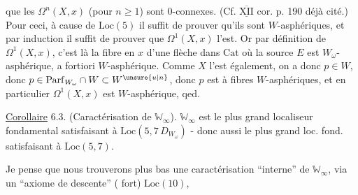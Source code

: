 que les $\Omega^n(X,x)$ (pour $n\geq1$) sont $0$-connexes. (Cf. $\overline{\underline{\mathrm{XII}}}$ cor. p. 190 déjà cité.) Pour ceci, à cause de $\mathrm{Loc}(5)$ il suffit de prouver qu'ils sont $W$-asphériques, et par induction il suffit de prouver que $\Omega^1(X,x)$ l'est. Or par définition de $\Omega^1(X,x)$, c'est là la fibre en $x$ d'une flèche dans $\mathrm{Cat}$
où la source $E$ est $W_\omega$-asphérique, a fortiori $W$-asphérique. Comme $X$ l'est également, on a donc $p\in W$, donc $p\in\mathrm{Parf}_{W_\omega}\cap W\subset W^{\unsure{u|n}}$, donc $p$ est à fibres $W$-asphériques, et en particulier $\Omega^1(X,x)$ est $W$-asphérique, qed.

\uline{Corollaire} 6.3. (Caractérisation de $\mathbb W_\infty$). $\mathbb W_\infty$ est le plus grand localiseur fondamental satisfaisant à $\mathrm{Loc}(5,7\,D_{W_\omega})$ - donc aussi le plus grand loc. fond. satisfaisant à $\mathrm{Loc}(5,7)$.

Je pense que nous trouverons plus bas une caractérisation ``interne'' de $\mathbb W_\infty$, via un ``axiome de descente'' (  fort) $\mathrm{Loc}(10)$,
